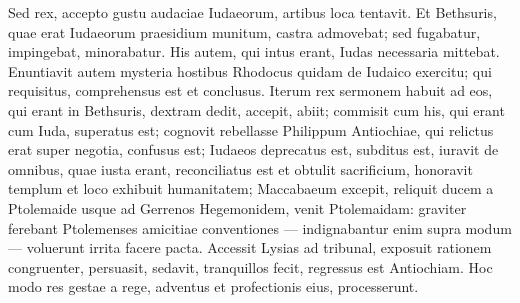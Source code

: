 \begin{biblechapter}
\verse Sed rex, accepto gustu audaciae Iudaeorum, artibus loca tentavit. 
\verse Et Bethsuris, quae erat Iudaeorum praesidium munitum, castra admovebat; sed fugabatur, impingebat, minorabatur. 
\verse His autem, qui intus erant, Iudas necessaria mittebat. 
\verse Enuntiavit autem mysteria hostibus Rhodocus quidam de Iudaico exercitu; qui requisitus, comprehensus est et conclusus. 
\verse Iterum rex sermonem habuit ad eos, qui erant in Bethsuris, dextram dedit, accepit, abiit; 
\verse commisit cum his, qui erant cum Iuda, superatus est; cognovit rebellasse Philippum Antiochiae, qui relictus erat super negotia, confusus est; Iudaeos deprecatus est, subditus est, iuravit de omnibus, quae iusta erant, reconciliatus est et obtulit sacrificium, honoravit templum et loco exhibuit humanitatem; 
\verse Maccabaeum excepit, reliquit ducem a Ptolemaide usque ad Gerrenos Hegemonidem, 
\verse venit Ptolemaidam: graviter ferebant Ptolemenses amicitiae conventiones — indignabantur enim supra modum — voluerunt irrita facere pacta. 
\verse Accessit Lysias ad tribunal, exposuit rationem congruenter, persuasit, sedavit, tranquillos fecit, regressus est Antiochiam. Hoc modo res gestae a rege, adventus et profectionis eius, processerunt. 
\end{biblechapter}

